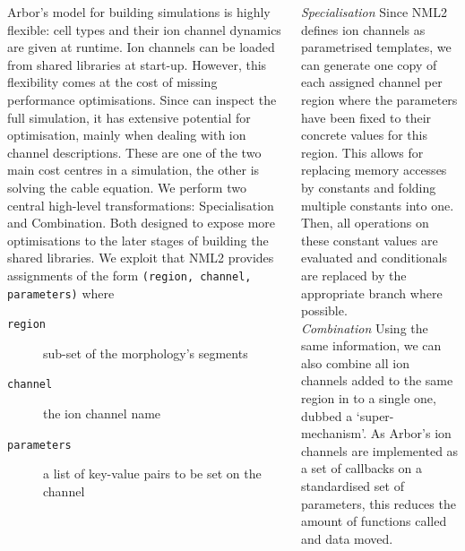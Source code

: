 \documentclass{beamer}
\begin{document}
\begin{frame}[t, fragile]
\begin{columns}[t]
\begin{column}{0.49\textwidth}
      Arbor's model for building simulations is highly flexible: cell types and
      their ion channel dynamics are given at runtime. Ion channels can be
      loaded from shared libraries at start-up. However, this flexibility comes
      at the cost of missing performance optimisations. Since \nmlcc can
      inspect the full simulation, it has extensive potential for optimisation,
      mainly when dealing with ion channel descriptions. These are one of the
      two main cost centres in a simulation, the other is solving the cable
      equation. We perform two central high-level transformations:
      Specialisation and Combination. Both designed to expose more optimisations
      to the later stages of building the shared libraries. We exploit that NML2
      provides assignments of the form \verb!(region, channel, parameters)!
      where
      \begin{description}
        \item[\texttt{region}] sub-set of the morphology's segments
        \item[\texttt{channel}] the ion channel name
        \item[\texttt{parameters}] a list of key-value pairs to be set on the channel
      \end{description}
    \end{column}
    \begin{column}{0.49\textwidth}
      \emph{Specialisation} Since NML2 defines ion channels as parametrised
      templates, we can generate one copy of each assigned channel per region
      where the parameters have been fixed to their concrete values for this
      region. This allows for replacing memory accesses by constants and folding
      multiple constants into one. Then, all operations on these constant values
      are evaluated and conditionals are replaced by the appropriate branch
      where possible.\\[1.5ex]
      \emph{Combination} Using the same information, we can also combine all ion
      channels added to the same region in to a single one, dubbed a
      `super-mechanism'. As Arbor's ion channels are implemented as a set of
      callbacks on a standardised set
      of parameters, this reduces the amount of functions called and data moved.\\[1.5ex]


\end{column}
\end{columns}
\end{frame}
\end{document}
